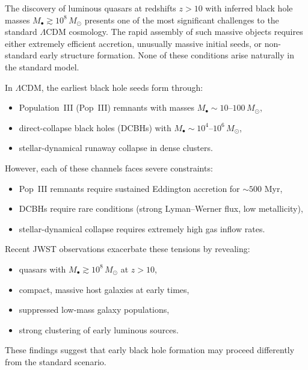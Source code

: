 \documentclass[11pt,a4paper]{article}
\begin{document}
The discovery of luminous quasars at redshifts $z > 10$ with inferred black hole masses 
$M_{\bullet} \gtrsim 10^{8}\,M_{\odot}$ presents one of the most significant challenges to the 
standard $\Lambda$CDM cosmology. The rapid assembly of such massive objects requires either 
extremely efficient accretion, unusually massive initial seeds, or non-standard early 
structure formation. None of these conditions arise naturally in the standard model.

In $\Lambda$CDM, the earliest black hole seeds form through:

\begin{itemize}
    \item Population~III (Pop~III) remnants with masses 
          $M_{\bullet} \sim 10$--$100\,M_{\odot}$,
    \item direct-collapse black holes (DCBHs) with 
          $M_{\bullet} \sim 10^{4}$--$10^{6}\,M_{\odot}$,
    \item stellar-dynamical runaway collapse in dense clusters.
\end{itemize}

However, each of these channels faces severe constraints:

\begin{itemize}
    \item Pop~III remnants require sustained Eddington accretion for $\sim 500$ Myr,
    \item DCBHs require rare conditions (strong Lyman–Werner flux, low metallicity),
    \item stellar-dynamical collapse requires extremely high gas inflow rates.
\end{itemize}

Recent JWST observations exacerbate these tensions by revealing:

\begin{itemize}
    \item quasars with $M_{\bullet} \gtrsim 10^{8}\,M_{\odot}$ at $z > 10$,
    \item compact, massive host galaxies at early times,
    \item suppressed low-mass galaxy populations,
    \item strong clustering of early luminous sources.
\end{itemize}

These findings suggest that early black hole formation may proceed differently from the 
standard scenario.

\end{document}
